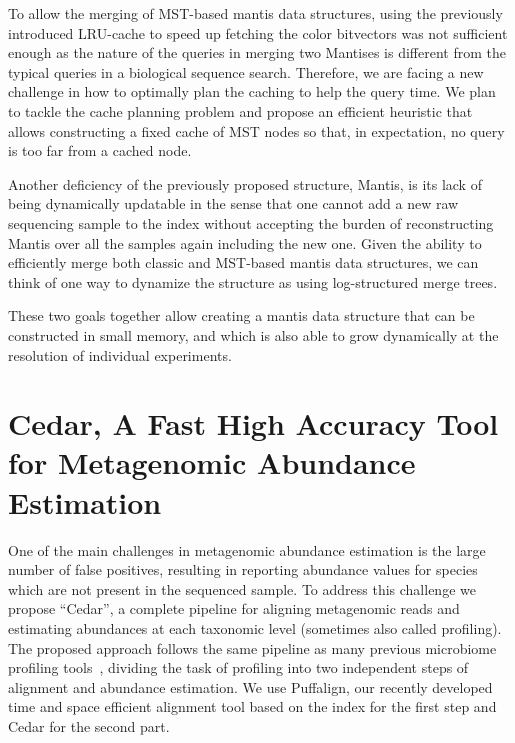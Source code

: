 To allow the merging of MST-based mantis data structures,
using the previously introduced LRU-cache to speed up fetching the color bitvectors
was not sufficient enough as the nature of the queries in merging two Mantises
is different from the typical queries in a biological sequence search.
Therefore, we are facing a new challenge in how to optimally plan the caching
to help the query time. We plan to tackle the cache planning problem and
propose an efficient heuristic that allows constructing a fixed cache of MST nodes
so that, in expectation, no query is too far from a cached node.

Another deficiency of the previously proposed structure, Mantis,
is its lack of being dynamically updatable in the sense that one cannot
add a new raw sequencing sample to the index without accepting the burden of
reconstructing Mantis over all the samples again including the new one.
Given the ability to efficiently merge both classic and MST-based mantis data structures,
we can think of one way to dynamize the structure as using log-structured merge trees.

These two goals together allow creating a mantis data structure that can be constructed in small memory,
and which is also able to grow dynamically at the resolution of individual experiments.


\section{Cedar, A Fast High Accuracy Tool for Metagenomic Abundance Estimation}
One of the main challenges in metagenomic abundance estimation is the large number of
false positives, resulting in reporting abundance values for species
which are not present in the sequenced sample.
To address this challenge we propose ``Cedar'',
a complete pipeline for aligning metagenomic reads and estimating abundances
at each taxonomic level (sometimes also called profiling).
The proposed approach follows the same pipeline as many previous microbiome profiling tools~\cite{},
dividing the task of profiling into two independent steps of alignment and abundance estimation.
We use Puffalign, our recently developed time and space efficient alignment tool
based on the \pufferfish index for the first step and Cedar for the second part.

